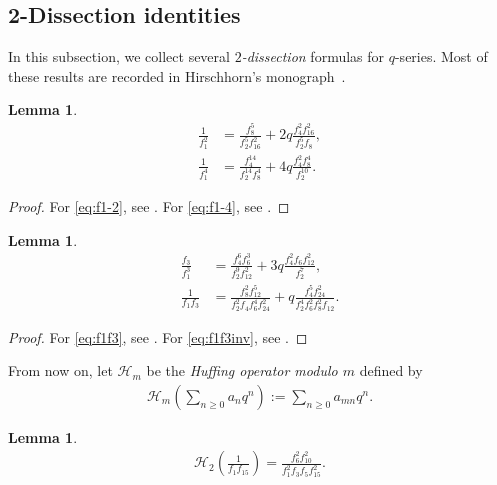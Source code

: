 \documentclass[12pt,reqno]{amsart}
\numberwithin{equation}{section}
\theoremstyle{plain}
\newtheorem{lemma}[theorem]{Lemma}
\theoremstyle{definition}
\theoremstyle{named}
\newcommand{\HH}{\mathcal{H}}
\begin{document}
\subsection{2-Dissection identities}

In this subsection, we collect several \emph{$2$-dissection} formulas for $q$-series. 
Most of these results are recorded in Hirschhorn's monograph~\cite{Hir}.  

\begin{lemma}
	\begin{align}
		\frac{1}{f_1^2}&=\frac{f_8^5}{f_2^5f_{16}^2}+2q\frac{f_4^2f_{16}^2}{f_2^5f_8},\label{eq:f1-2}\\
		\frac{1}{f_1^4}&=\frac{f_4^{14}}{f_2^{14}f_8^4}+4q\frac{f_4^2f_8^4}{f_2^{10}}.\label{eq:f1-4}
	\end{align}
\end{lemma}

\begin{proof}
	For \eqref{eq:f1-2}, see \cite[eq.~(1.9.4)]{Hir}. For \eqref{eq:f1-4}, see \cite[eq.~(1.10.1)]{Hir}.
\end{proof}

\begin{lemma}
	\begin{align}
		\frac{f_3}{f_1^3}&=\frac{f_4^6f_6^3}{f_2^9f_{12}^2}+3q\frac{f_4^2f_6f_{12}^2}{f_2^7},\label{eq:f1f3}\\
		\frac{1}{f_1f_3}&= \frac{f_8^2f_{12}^5}{f_2^2f_4f_6^4f_{24}^2}+q\frac{f_4^5f_{24}^2}{f_2^4f_6^2f_8^2f_{12}}.\label{eq:f1f3inv}
	\end{align}
\end{lemma}

\begin{proof}
	For \eqref{eq:f1f3}, see \cite[eq.~(22.7.3) with $q \mapsto -q$]{Hir}. For \eqref{eq:f1f3inv}, see \cite[eq.~(30.12.3)]{Hir}.
\end{proof}

From now on, let $\HH_m$ be the \emph{Huffing operator modulo $m$} defined by \cite[eq.~(19.4.7)]{Hir}
\begin{align*}
	\HH_m\left(\sum_{n\ge 0} a_n q^n\right) := \sum_{n\ge 0} a_{mn} q^n.
\end{align*}

\begin{lemma}\label{le:H-f1f15}
	\begin{align}\label{eq:H-f1f15}
		\HH_2\left(\frac{1}{f_1 f_{15}}\right) = \frac{f_{6}^2f_{10}^2}{f_1^2f_3f_{5}f_{15}^2}.
	\end{align}
\end{lemma}
\end{document}
